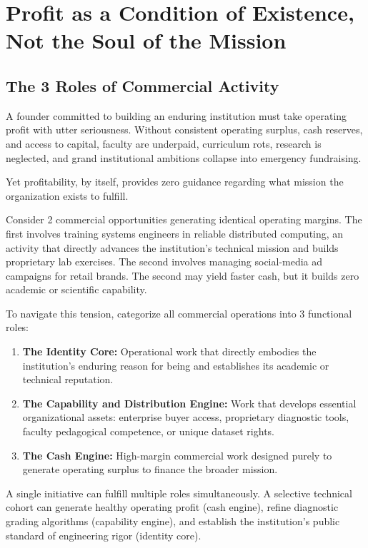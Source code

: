 \section{Profit as a Condition of Existence, Not the Soul of the Mission}

\subsection{The 3 Roles of Commercial Activity}

A founder committed to building an enduring institution must take operating profit with utter seriousness. Without consistent operating surplus, cash reserves, and access to capital, faculty are underpaid, curriculum rots, research is neglected, and grand institutional ambitions collapse into emergency fundraising.

Yet profitability, by itself, provides zero guidance regarding what mission the organization exists to fulfill.

Consider 2 commercial opportunities generating identical operating margins. The first involves training systems engineers in reliable distributed computing, an activity that directly advances the institution's technical mission and builds proprietary lab exercises. The second involves managing social-media ad campaigns for retail brands. The second may yield faster cash, but it builds zero academic or scientific capability.

To navigate this tension, categorize all commercial operations into 3 functional roles:

\begin{enumerate}[leftmargin=12pt,itemsep=2pt,topsep=1pt,parsep=0pt]
  \item \textbf{The Identity Core:} Operational work that directly embodies the institution's enduring reason for being and establishes its academic or technical reputation.
  \item \textbf{The Capability and Distribution Engine:} Work that develops essential organizational assets: enterprise buyer access, proprietary diagnostic tools, faculty pedagogical competence, or unique dataset rights.
  \item \textbf{The Cash Engine:} High-margin commercial work designed purely to generate operating surplus to finance the broader mission.
\end{enumerate}

A single initiative can fulfill multiple roles simultaneously. A selective technical cohort can generate healthy operating profit (cash engine), refine diagnostic grading algorithms (capability engine), and establish the institution's public standard of engineering rigor (identity core).

